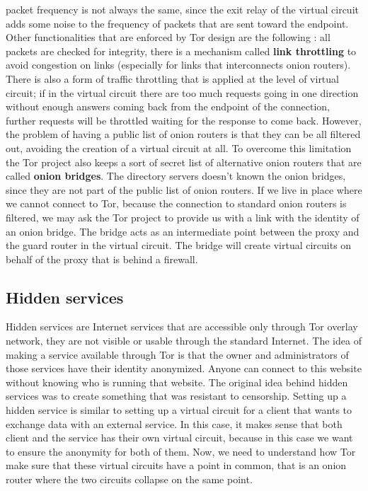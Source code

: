 packet frequency is not always the same, since the exit relay of the virtual circuit adds some noise to the frequency of packets that are sent toward the endpoint. Other functionalities that are enforced by Tor design are the following : all packets are checked for integrity, there is a mechanism called \textbf{link throttling} to avoid congestion on links (especially for links that interconnects onion routers). There is also a form of traffic throttling that is applied at the level of virtual circuit; if in the virtual circuit there are too much requests going in one direction without enough answers coming back from the endpoint of the connection, further requests will be throttled waiting for the response to come back. However, the problem of having a public list of onion routers is that they can be all filtered out, avoiding the creation of a virtual circuit at all. To overcome this limitation the Tor project also keeps a sort of secret list of alternative onion routers that are called \textbf{onion bridges}. The directory servers doesn't known the onion bridges, since they are not part of the public list of onion routers. If we live in place where we cannot connect to Tor, because the connection to standard onion routers is filtered, we may ask the Tor project to provide us with a link with the identity of an onion bridge. The bridge acts as an intermediate point between the proxy and the guard router in the virtual circuit. The bridge will create virtual circuits on behalf of the proxy that is behind a firewall.

\subsection{Hidden services}
Hidden services are Internet services that are accessible only through Tor overlay network, they are not visible or usable through the standard Internet. The idea of making a service available through Tor is that the owner and administrators of those services have their identity anonymized. Anyone can connect to this website without knowing who is running that website. The original idea behind hidden services was to create something that was resistant to censorship. Setting up a hidden service is similar to setting up a virtual circuit for a client that wants to exchange data with an external service. In this case, it makes sense that both client and the service has their own virtual circuit, because in this case we want to ensure the anonymity for both of them. Now, we need to understand how Tor make sure that these virtual circuits have a point in common, that is an onion router where the two circuits collapse on the same point. 

